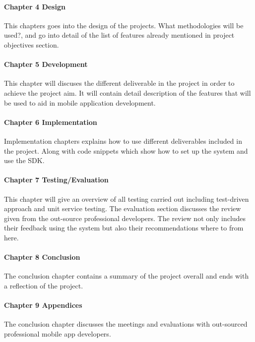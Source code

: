 \paragraph{Chapter 4 Design}

This chapters goes into the design of the projects. What methodologies will be used?, and go into detail of the list of features already mentioned in project objectives section.

\paragraph{Chapter 5 Development}

This chapter will discuses the different deliverable in the project in order to achieve the project aim. It will contain detail description of the features that will be used to aid in mobile application development.

\paragraph{Chapter 6 Implementation}

Implementation chapters explains how to use different deliverables included in the project. Along with code snippets which show how to set up the system and use the SDK.

\paragraph{Chapter 7 Testing/Evaluation}

This chapter will give an overview of all testing carried out including test-driven approach and unit service testing. The evaluation section discusses the review given from the out-source professional developers. The review not only includes their feedback using the system but also their recommendations where to from here. 

\paragraph{Chapter 8 Conclusion}
The conclusion chapter contains a summary of the project overall and ends with a reflection of the project.

\paragraph{Chapter 9 Appendices}
The conclusion chapter discusses the meetings and evaluations with out-sourced professional mobile app developers.